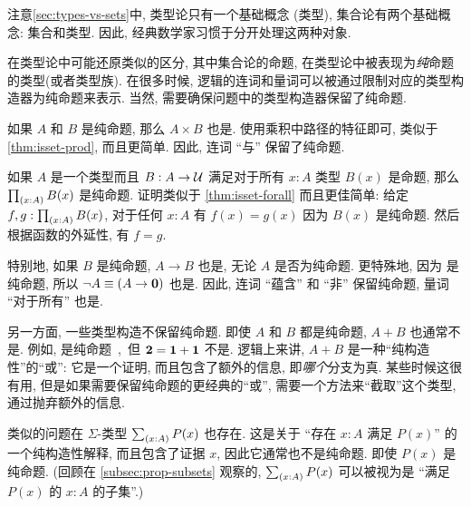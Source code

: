 %
注意\cref{sec:types-vs-sets}中, 类型论只有一个基础概念 (类型), 集合论有两个基础概念: 集合和类型.
因此, 经典数学家习惯于分开处理这两种对象.

在类型论中可能还原类似的区分, 其中集合论的命题, 在类型论中被表现为\emph{纯}命题的类型(或者类型族).
在很多时候, 逻辑的连词和量词可以被通过限制对应的类型构造器为纯命题来表示.
当然, 需要确保问题中的类型构造器保留了纯命题.

\begin{eg}
  如果 $A$ 和 $B$ 是纯命题, 那么 $A\times B$ 也是.
  使用乘积中路径的特征即可, 类似于 \cref{thm:isset-prod}, 而且更简单.
  因此, 连词 ``与'' 保留了纯命题.
\end{eg}

\begin{eg}\label{thm:isprop-forall}
  如果 $A$ 是一个类型而且 $B:A\to \mathcal{U}$ 满足对于所有 $x:A$ 类型 $B(x)$ 是命题, 那么 $\prd{x:A} B(x)$ 是纯命题.
  证明类似于 \cref{thm:isset-forall} 而且更佳简单: 给定 $f,g:\prd{x:A} B(x)$, 对于任何 $x:A$ 有 $f(x)=g(x)$ 因为 $B(x)$ 是纯命题.
  然后根据函数的外延性, 有 $f=g$.

  特别地, 如果 $B$ 是纯命题, $A\to B$ 也是, 无论 $A$ 是否为纯命题.
  更特殊地, 因为 \emptyt 是纯命题, 所以 $\neg A \equiv (A\to\mathbf{0})$ 也是.
  因此, 连词 ``蕴含'' 和 ``非'' 保留纯命题, 量词 ``对于所有'' 也是.
\end{eg}

另一方面, 一些类型构造不保留纯命题.
即使 $A$ 和 $B$ 都是纯命题, $A+B$ 也通常不是.
例如, \unit 是纯命题, 但 $\mathbf{2}=\mathbf{1}+\mathbf{1}$ 不是.
逻辑上来讲, $A+B$ 是一种``纯构造性''的``或'': 它是一个证明, 而且包含了额外的信息, 即\emph{哪个}分支为真.
某些时候这很有用, 但是如果需要保留纯命题的更经典的``或'', 需要一个方法来``截取''这个类型, 通过抛弃额外的信息.

%
类似的问题在 $\Sigma$-类型 $\sm{x:A} P(x)$ 也存在.
这是关于 ``存在 $x:A$ 满足 $P(x)$'' 的一个纯构造性解释, 而且包含了证据 $x$, 因此它通常也不是纯命题. 即使 $P(x)$ 是纯命题.
(回顾在 \cref{subsec:prop-subsets} 观察的, $\sm{x:A} P(x)$ 可以被视为是 ``满足 $P(x)$ 的 $x:A$ 的子集''.)

